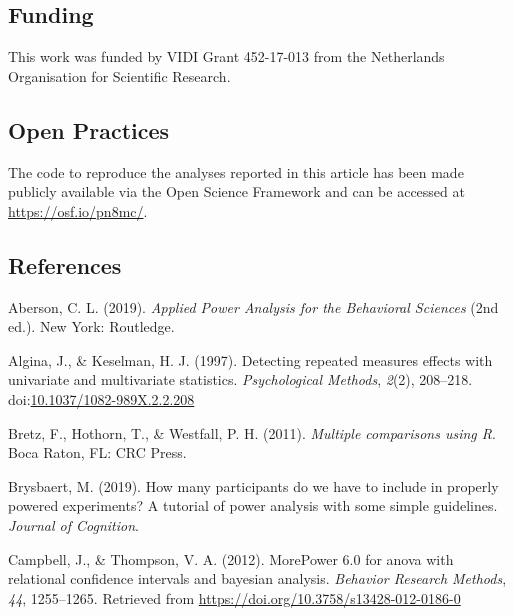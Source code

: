 \documentclass[,man,floatsintext]{apa6}
\begin{document}
\hypertarget{funding}{%
\subsection{Funding}\label{funding}}

This work was funded by VIDI Grant 452-17-013 from the Netherlands Organisation for Scientific Research.

\hypertarget{open-practices}{%
\subsection{Open Practices}\label{open-practices}}

The code to reproduce the analyses reported in this article has been made publicly available via the Open Science Framework and can be accessed at \url{https://osf.io/pn8mc/}.

\hypertarget{references}{%
\subsection{References}\label{references}}

\setlength{\parindent}{-0.5in}
\setlength{\leftskip}{0.5in}

\hypertarget{refs}{}
\leavevmode\hypertarget{ref-aberson_applied_2019}{}%
Aberson, C. L. (2019). \emph{Applied Power Analysis for the Behavioral Sciences} (2nd ed.). New York: Routledge.

\leavevmode\hypertarget{ref-algina_detecting_1997}{}%
Algina, J., \& Keselman, H. J. (1997). Detecting repeated measures effects with univariate and multivariate statistics. \emph{Psychological Methods}, \emph{2}(2), 208--218. doi:\href{https://doi.org/10.1037/1082-989X.2.2.208}{10.1037/1082-989X.2.2.208}

\leavevmode\hypertarget{ref-bretz_multiple_2011}{}%
Bretz, F., Hothorn, T., \& Westfall, P. H. (2011). \emph{Multiple comparisons using R}. Boca Raton, FL: CRC Press.

\leavevmode\hypertarget{ref-brysbaert_how_2019}{}%
Brysbaert, M. (2019). How many participants do we have to include in properly powered experiments? A tutorial of power analysis with some simple guidelines. \emph{Journal of Cognition}.

\leavevmode\hypertarget{ref-Campbell2012MorePower6F}{}%
Campbell, J., \& Thompson, V. A. (2012). MorePower 6.0 for anova with relational confidence intervals and bayesian analysis. \emph{Behavior Research Methods}, \emph{44}, 1255--1265. Retrieved from \url{https://doi.org/10.3758/s13428-012-0186-0}
\end{document}

